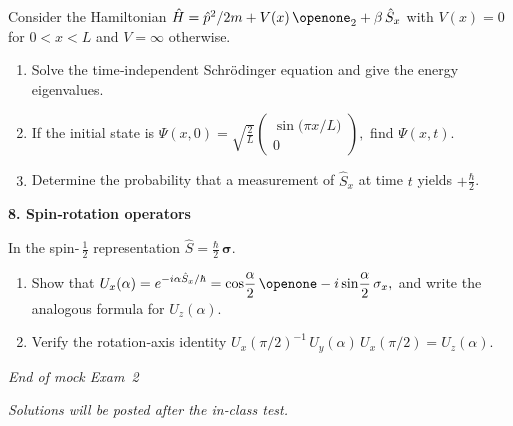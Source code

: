 \documentclass[12pt]{article}
\newcommand{\qs}{\bigskip\bigskip}
\newcommand{\vv}{\medskip}
\begin{document}
Consider the Hamiltonian
$
 \hat H = \hat p^{2}/2m + V(x)\,\openone_2 + \beta\,\hat S_x
$
with $V(x)=0$ for $0<x<L$ and $V=\infty$ otherwise.

\begin{enumerate}[label=\textbf{\alph*)}, leftmargin=1.2cm]
  \item  Solve the time‑independent Schrödinger equation and give the
        energy eigenvalues.\vv
  \item  If the initial state is
        $
          \displaystyle
          \Psi(x,0)=\sqrt{\frac{2}{L}}
          \begin{pmatrix}
            \sin\!\bigl(\pi x/L\bigr)\\[4pt] 0
          \end{pmatrix},
          $
        find $\Psi(x,t)$.\vv
  \item  Determine the probability that a measurement of $\hat S_x$ at
        time $t$ yields $+\tfrac{\hbar}{2}$.
\end{enumerate}

\newpage
{\large\bfseries 8.\; Spin‑rotation operators}\qs

In the spin‑\,$\tfrac12$ representation $\hat S = \frac{\hbar}{2}\,\boldsymbol\sigma$.

\begin{enumerate}[label=\textbf{\alph*)}, leftmargin=1.2cm]
  \item  Show that
        $\displaystyle
          U_x(\alpha)=e^{-i\alpha\hat S_x/\hbar}
          =\cos\!\frac{\alpha}{2}\,\openone
          -i\sin\!\frac{\alpha}{2}\,\sigma_x,
        $
        and write the analogous formula for $U_z(\alpha)$.\vv
  \item  Verify the rotation‑axis identity
        $
          U_x(\pi/2)^{-1}\,U_y(\alpha)\,U_x(\pi/2)=U_z(\alpha).
        $
\end{enumerate}

\newpage
\begin{center}
  {\large\slshape End of mock Exam 2}\bigskip

  \emph{Solutions will be posted after the in‑class test.}
\end{center}
\end{document}
